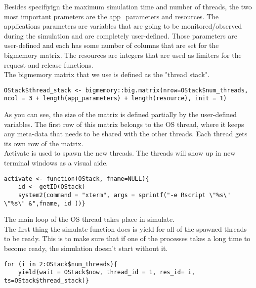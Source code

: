 \documentclass[fleqn]{article}
\begin{document}
Besides specifiyign the maximum simulation time and number of threads, the two most important prameters are the app\_parameters and resources. The applications parameters are variables that are going to be monitored/observed during the simulation and are completely user-defined. Those parameters are user-defined and each has some number of columns that are set for the bigmemory matrix. The resources are integers that are used as limiters for the request and release functions.\\

The bigmemory matrix that we use is defined as the "thread stack".
\begin{lstlisting}
OStack$thread_stack <- bigmemory::big.matrix(nrow=OStack$num_threads, ncol = 3 + length(app_parameters) + length(resource), init = 1)
\end{lstlisting}
As you can see, the size of the matrix is defined partially by the user-defined variables. The first row of this matrix belongs to the OS thread, where it keeps any meta-data that needs to be shared with the other threads. Each thread gets its own row of the matrix.\\

Activate is used to spawn the new threads. The threads will show up in new terminal windows as a visual aide.
\begin{lstlisting}
activate <- function(OStack, fname=NULL){
	id <- getID(OStack)
  	system2(command = "xterm", args = sprintf("-e Rscript \"%s\" \"%s\" &",fname, id ))}
\end{lstlisting}

The main loop of the OS thread takes place in simulate.\\

The first thing the simulate function does is yield for all of the spawned threads to be ready. This is to make sure that if one of the processes takes a long time to become ready, the simulation doesn't start without it.
\begin{lstlisting}
for (i in 2:OStack$num_threads){
    yield(wait = OStack$now, thread_id = 1, res_id= i, ts=OStack$thread_stack)}
\end{lstlisting}
\end{document}

